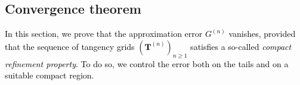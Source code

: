\documentclass[review]{elsarticle}
\newcommand{\cblue}{\textcolor{black}}
\begin{document}
\subsection{Convergence theorem}
\cblue{
In this section, we prove that the approximation error $G^{(n)}$ vanishes, provided that the sequence of tangency grids $(\mathbf{T}^{(n)})_{n\ge 1}$ satisfies a so-called \emph{compact refinement property}. To do so, we control the error both on the tails and on a suitable compact region. %
}
\end{document}
